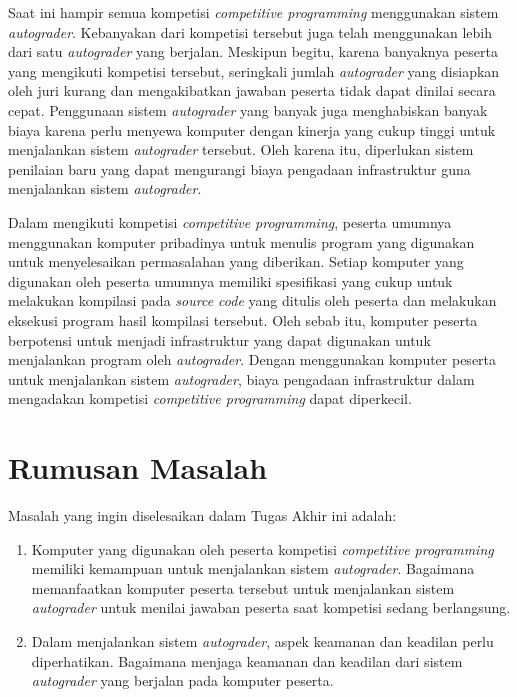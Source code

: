 \par Saat ini hampir semua kompetisi \textit{competitive programming} menggunakan sistem \textit{autograder}. Kebanyakan dari kompetisi tersebut juga telah menggunakan lebih dari satu \textit{autograder} yang berjalan. Meskipun begitu, karena banyaknya peserta yang mengikuti kompetisi tersebut, seringkali jumlah \textit{autograder} yang disiapkan oleh juri kurang dan mengakibatkan jawaban peserta tidak dapat dinilai secara cepat. Penggunaan sistem \textit{autograder} yang banyak juga menghabiskan banyak biaya karena perlu menyewa komputer dengan kinerja yang cukup tinggi untuk menjalankan sistem \textit{autograder} tersebut. Oleh karena itu, diperlukan sistem penilaian baru yang dapat mengurangi biaya pengadaan infrastruktur guna menjalankan sistem \textit{autograder}.

\par Dalam mengikuti kompetisi \textit{competitive programming}, peserta umumnya menggunakan komputer pribadinya untuk menulis program yang digunakan untuk menyelesaikan permasalahan yang diberikan. Setiap komputer yang digunakan oleh peserta umumnya memiliki spesifikasi yang cukup untuk melakukan kompilasi pada \textit{source code} yang ditulis oleh peserta dan melakukan eksekusi program hasil kompilasi tersebut. Oleh sebab itu, komputer peserta berpotensi untuk menjadi infrastruktur yang dapat digunakan untuk menjalankan program oleh \textit{autograder}. Dengan menggunakan komputer peserta untuk menjalankan sistem \textit{autograder}, biaya pengadaan infrastruktur dalam mengadakan kompetisi \textit{competitive programming} dapat diperkecil.

\section{Rumusan Masalah}

\par Masalah yang ingin diselesaikan dalam Tugas Akhir ini adalah:
\begin{enumerate}
	\item Komputer yang digunakan oleh peserta kompetisi \textit{competitive programming} memiliki kemampuan untuk menjalankan sistem \textit{autograder}. Bagaimana memanfaatkan komputer peserta tersebut untuk menjalankan sistem \textit{autograder} untuk menilai jawaban peserta saat kompetisi sedang berlangsung.
	\item Dalam menjalankan sistem \textit{autograder}, aspek keamanan dan keadilan perlu diperhatikan. Bagaimana menjaga keamanan dan keadilan dari sistem \textit{autograder} yang berjalan pada komputer peserta.
\end{enumerate}

